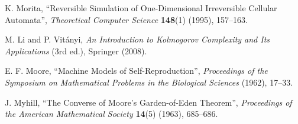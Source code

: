 \documentclass[12pt]{article}
\theoremstyle{plain}
\theoremstyle{definition}
\begin{document}
\begin{thebibliography}{99}
 K. Morita, ``Reversible Simulation of One-Dimensional Irreversible Cellular Automata'', \emph{Theoretical Computer Science} \textbf{148}(1) (1995), 157--163.

 M. Li and P. Vit\'{a}nyi, \emph{An Introduction to Kolmogorov Complexity and Its Applications} (3rd ed.), Springer (2008).

 E. F. Moore, ``Machine Models of Self-Reproduction'', \emph{Proceedings of the Symposium on Mathematical Problems in the Biological Sciences} (1962), 17--33.

 J. Myhill, ``The Converse of Moore's Garden-of-Eden Theorem'', \emph{Proceedings of the American Mathematical Society} \textbf{14}(5) (1963), 685--686.

\end{thebibliography}
\end{document}
